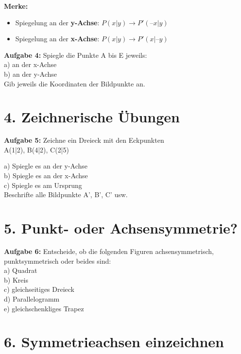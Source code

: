 \textbf{Merke:}
\begin{itemize}
    \item Spiegelung an der \textbf{y-Achse}: \( P(x|y) \rightarrow P'(–x|y) \)
    \item Spiegelung an der \textbf{x-Achse}: \( P(x|y) \rightarrow P'(x|–y) \)
\end{itemize}

\textbf{Aufgabe 4:} Spiegle die Punkte A bis E jeweils: \\
a) an der x-Achse \\
b) an der y-Achse \\
Gib jeweils die Koordinaten der Bildpunkte an.

\vspace{1cm}

\section*{4. Zeichnerische Übungen}

\textbf{Aufgabe 5:} Zeichne ein Dreieck mit den Eckpunkten \\
A(1|2), B(4|2), C(2|5)

\vspace{0.3cm}
a) Spiegle es an der y-Achse \\
b) Spiegle es an der x-Achse \\
c) Spiegle es am Ursprung \\
Beschrifte alle Bildpunkte A', B', C' usw.

\vspace{1cm}

\section*{5. Punkt- oder Achsensymmetrie?}

\textbf{Aufgabe 6:} Entscheide, ob die folgenden Figuren achsensymmetrisch, punktsymmetrisch oder beides sind: \\
a) Quadrat \\
b) Kreis \\
c) gleichseitiges Dreieck \\
d) Parallelogramm \\
e) gleichschenkliges Trapez

\vspace{1cm}

\section*{6. Symmetrieachsen einzeichnen}

